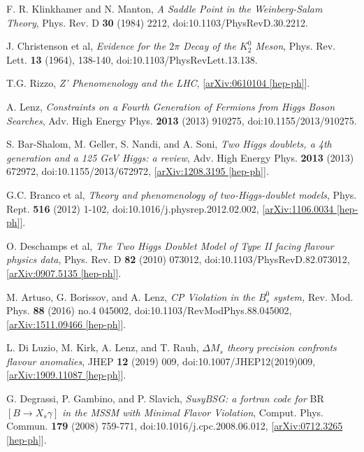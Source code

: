 \documentclass[a4paper,12pt]{article}
\begin{document}
\begin{thebibliography}{99}
F. R. Klinkhamer and N. Manton, \emph{A Saddle Point in the Weinberg-Salam Theory}, Phys. Rev. D \textbf{30} (1984) 2212, doi:10.1103/PhysRevD.30.2212.

J. Christenson et al, \emph{Evidence for the $2\pi$ Decay of the $K_2^0$ Meson}, Phys. Rev. Lett. \textbf{13} (1964), 138-140, doi:10.1103/PhysRevLett.13.138.

T.G. Rizzo, \emph{Z' Phenomenology and the LHC}, [\href{https://arxiv.org/abs/hep-ph/0610104}{arXiv:0610104 [hep-ph]}].

A. Lenz, \emph{Constraints on a Fourth Generation of Fermions from Higgs Boson Searches}, Adv. High Energy Phys. \textbf{2013} (2013) 910275, doi:10.1155/2013/910275.

S. Bar-Shalom, M. Geller, S. Nandi, and A. Soni, \emph{Two Higgs doublets, a 4th generation and a 125 GeV Higgs: a review}, Adv. High Energy Phys. \textbf{2013} (2013) 672972, doi:10.1155/2013/672972, [\href{https://arxiv.org/abs/1208.3195v2}{arXiv:1208.3195 [hep-ph]}].

G.C. Branco et al, \emph{Theory and phenomenology of two-Higgs-doublet models}, Phys. Rept. \textbf{516} (2012) 1-102, doi:10.1016/j.physrep.2012.02.002, [\href{https://arxiv.org/pdf/1106.0034.pdf}{arXiv:1106.0034 [hep-ph]}].

O. Deschamps et al, \emph{The Two Higgs Doublet Model of Type II facing flavour physics data}, Phys. Rev. D \textbf{82} (2010) 073012, doi:10.1103/PhysRevD.82.073012, [\href{https://arxiv.org/abs/0907.5135}{arXiv:0907.5135 [hep-ph]}].

M. Artuso, G. Borissov, and A. Lenz, \emph{CP Violation in the $B_s^0$ system,} Rev. Mod. Phys. \textbf{88} (2016) no.4 045002, doi:10.1103/RevModPhys.88.045002, [\href{https://arxiv.org/abs/1511.09466}{arXiv:1511.09466 [hep-ph]}].

L. Di Luzio, M. Kirk, A. Lenz, and T. Rauh, \emph{$\Delta M_s$ theory precision confronts flavour anomalies}, JHEP \textbf{12} (2019) 009, doi:10.1007/JHEP12(2019)009, [\href{https://arxiv.org/abs/1909.11087}{arXiv:1909.11087 [hep-ph]}].

G. Degrassi, P. Gambino, and P. Slavich, \emph{SusyBSG: a fortran code for} BR$[B\to X_s\gamma]$ \emph{in the MSSM with Minimal Flavor Violation}, Comput. Phys. Commun. \textbf{179} (2008) 759-771, doi:10.1016/j.cpc.2008.06.012, [\href{https://arxiv.org/abs/0712.3265}{arXiv:0712.3265 [hep-ph]}].


\end{thebibliography}
\end{document}
